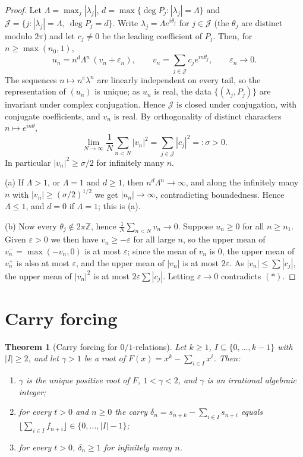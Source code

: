 \documentclass[11pt]{amsart}
\newtheorem{thm}[lemma]{Theorem}
\theoremstyle{definition}
\theoremstyle{remark}
\newcommand{\Z}{\mathbb{Z}}
\newcommand{\fl}[1]{\lfloor #1\rfloor}
\begin{document}
\begin{proof}
Let $\Lambda=\max_j|\lambda_j|$, $d=\max\{\deg P_j:|\lambda_j|=\Lambda\}$ and
$\mathcal J=\{j:|\lambda_j|=\Lambda,\ \deg P_j=d\}$. Write $\lambda_j=\Lambda e^{i\theta_j}$ for
$j\in\mathcal J$ (the $\theta_j$ are distinct modulo $2\pi$) and let $c_j\ne0$ be the
leading coefficient of $P_j$. Then, for $n\ge\max(n_0,1)$,
\[
  u_n=n^d\Lambda^n\,(v_n+\varepsilon_n),\qquad v_n=\sum_{j\in\mathcal J}c_je^{in\theta_j},\qquad
  \varepsilon_n\to0 .
\]
The sequences $n\mapsto n^e\lambda^n$ are linearly independent on every tail, so the
representation of $(u_n)$ is unique; as $u_n$ is real, the data $\{(\lambda_j,P_j)\}$ are
invariant under complex conjugation. Hence $\mathcal J$ is closed under conjugation, with
conjugate coefficients, and $v_n$ is real. By orthogonality of distinct characters
$n\mapsto e^{in\theta}$,
\[
  \lim_{N\to\infty}\frac1N\sum_{n<N}|v_n|^2=\sum_{j\in\mathcal J}|c_j|^2=:\sigma>0. \tag{$*$}
\]
In particular $|v_n|^2\ge\sigma/2$ for infinitely many $n$.

(a) If $\Lambda>1$, or $\Lambda=1$ and $d\ge1$, then $n^d\Lambda^n\to\infty$, and along the
infinitely many $n$ with $|v_n|\ge(\sigma/2)^{1/2}$ we get $|u_n|\to\infty$, contradicting
boundedness. Hence $\Lambda\le1$, and $d=0$ if $\Lambda=1$; this is (a).

(b) Now every $\theta_j\notin2\pi\Z$, hence $\frac1N\sum_{n<N}v_n\to0$. Suppose $u_n\ge0$ for
all $n\ge n_1$. Given $\varepsilon>0$ we then have $v_n\ge-\varepsilon$ for all large $n$, so
the upper mean of $v_n^-=\max(-v_n,0)$ is at most $\varepsilon$; since the mean of $v_n$ is
$0$, the upper mean of $v_n^+$ is also at most $\varepsilon$, and the upper mean of $|v_n|$
is at most $2\varepsilon$. As $|v_n|\le\sum|c_j|$, the upper mean of $|v_n|^2$ is at most
$2\varepsilon\sum|c_j|$. Letting $\varepsilon\to0$ contradicts $(*)$.
\end{proof}

\section{Carry forcing}\label{sec:carry}

\begin{thm}[Carry forcing for $0/1$-relations]\label{thm:carrygeneral}
Let $k\ge1$, $I\subseteq\{0,\dots,k-1\}$ with $|I|\ge2$, and let $\gamma>1$ be a root of
$F(x)=x^k-\sum_{i\in I}x^i$. Then:
\begin{enumerate}[label=(\roman*)]
\item $\gamma$ is the unique positive root of $F$, $1<\gamma<2$, and $\gamma$ is an
irrational algebraic integer;
\item for every $t>0$ and $n\ge0$ the carry
$\delta_n=s_{n+k}-\sum_{i\in I}s_{n+i}$ equals $\fl{\sum_{i\in I}f_{n+i}}\in\{0,\dots,|I|-1\}$;
\item for every $t>0$, $\delta_n\ge1$ for infinitely many $n$.
\end{enumerate}
\end{thm}
\end{document}
